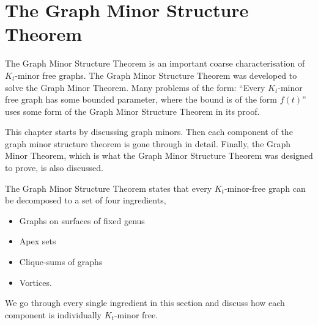 \chapter{The Graph Minor Structure Theorem}\label{chap:gmst}

The Graph Minor Structure Theorem is an important coarse characterisation of $K_t$-minor free graphs. The Graph Minor Structure Theorem was developed to solve the Graph Minor Theorem. Many problems of the form: ``Every $K_t$-minor free graph has some bounded parameter, where the bound is of the form $f(t)$'' uses some form of the Graph Minor Structure Theorem in its proof. 


This chapter starts by discussing graph minors. Then each component of the graph minor structure theorem is gone through in detail. Finally, the Graph Minor Theorem, which is what the Graph Minor Structure Theorem was designed to prove, is also discussed.

The Graph Minor Structure Theorem states that every $K_t$-minor-free graph can be decomposed to a set of four ingredients, 
\begin{itemize}
	\item Graphs on surfaces of fixed genus
	\item Apex sets
	\item Clique-sums of graphs
	\item Vortices.
\end{itemize}
We go through every single ingredient in this section and discuss how each component is individually $K_t$-minor free. 











